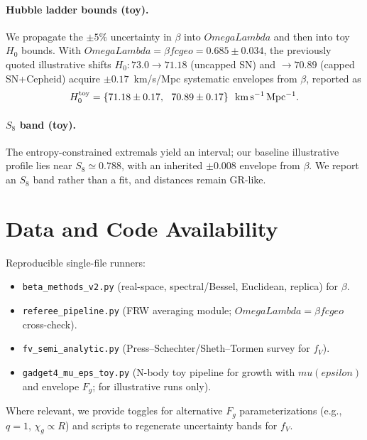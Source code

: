 \documentclass[aps,prd,onecolumn,superscriptaddress,nofootinbib]{revtex4-2}
\def\OmL{OmegaLambda}%
\def\cgeo{cgeo}%
\def\eps{epsilon}%
\def\mu{mu}%
\def\Omega_\Lambda{OmegaLambda}%
\providecommand{\OmL}{\Omega_\Lambda}
\providecommand{\cgeo}{c_{\rm geo}}
\providecommand{\eps}{\varepsilon}
\begin{document}
\paragraph{Hubble ladder bounds (toy).}
We propagate the \(\pm 5\%\) uncertainty in \(\beta\) into \(\OmL\) and then into toy \(H_0\) bounds. With \(\OmL=\beta f\cgeo=0.685\pm 0.034\), the previously quoted illustrative shifts \(H_0: 73.0\to 71.18\) (uncapped SN) and \(\to 70.89\) (capped SN+Cepheid) acquire \(\pm 0.17\)~km/s/Mpc systematic envelopes from \(\beta\), reported as
\[
H_0^{\rm toy}=\{71.18\pm 0.17,\ \ 70.89\pm 0.17\}\ \ \mathrm{km\,s^{-1}\,Mpc^{-1}}.
\]

\paragraph{\(S_8\) band (toy).}
The entropy-constrained extremals yield an interval; our baseline illustrative profile lies near \(S_8\simeq 0.788\), with an inherited \(\pm 0.008\) envelope from \(\beta\). We report an \(S_8\) band rather than a fit, and distances remain GR-like.

\section{Data and Code Availability}
\label{sec:data}
Reproducible single-file runners:
\begin{itemize}[leftmargin=*]
\item \texttt{beta\_methods\_v2.py} (real-space, spectral/Bessel, Euclidean, replica) for \(\beta\).
\item \texttt{referee\_pipeline.py} (FRW averaging module; \(\OmL=\beta f\cgeo\) cross-check).
\item \texttt{fv\_semi\_analytic.py} (Press--Schechter/Sheth--Tormen survey for \(f_V\)).
\item \texttt{gadget4\_mu\_eps\_toy.py} (N-body toy pipeline for growth with \(\mu(\eps)\) and envelope \(F_g\); for illustrative runs only).
\end{itemize}
Where relevant, we provide toggles for alternative \(F_g\) parameterizations (e.g., \(q=1\), \(\chi_g\propto R\)) and scripts to regenerate uncertainty bands for \(f_V\).
\end{document}
